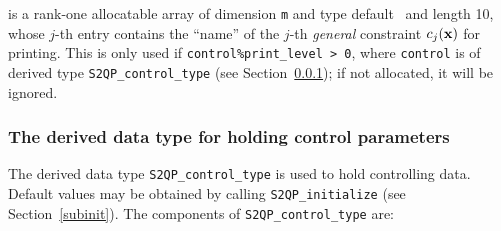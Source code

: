 \documentclass{galahad}
\newcommand{\packagename}{S2QP}
\begin{document}
\begin{description}
 is a rank-one allocatable array of dimension {\tt m} and
type default \character\ and length 10, whose $j$-th entry contains
the ``name'' of the $j$-th {\em general} constraint $c_j({\mathbf{x}})$ for
printing.  This is only used if {\tt control\%print\_level > 0}, where
{\tt control} is of derived type {\tt \packagename\_control\_type}
(see Section~\ref{typecontrol}); if not allocated, it will be ignored.

\end{description}


\subsubsection{The derived data type for holding control
 parameters}\label{typecontrol}
The derived data type
{\tt \packagename\_control\_type}
is used to hold controlling data. Default values may be obtained by calling
{\tt \packagename\_initialize}
(see Section~\ref{subinit}). The components of
{\tt \packagename\_control\_type}
are:
\end{document}
